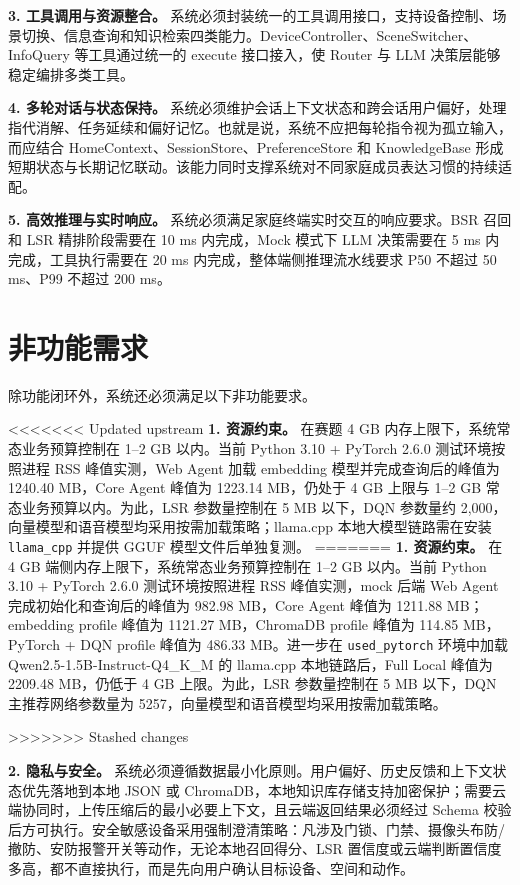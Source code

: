 \documentclass[12pt,a4paper,oneside]{ctexrep}
\begin{document}
\textbf{3. 工具调用与资源整合。} 系统必须封装统一的工具调用接口，支持设备控制、场景切换、信息查询和知识检索四类能力。DeviceController、SceneSwitcher、InfoQuery 等工具通过统一的 execute 接口接入，使 Router 与 LLM 决策层能够稳定编排多类工具。

\textbf{4. 多轮对话与状态保持。} 系统必须维护会话上下文状态和跨会话用户偏好，处理指代消解、任务延续和偏好记忆。也就是说，系统不应把每轮指令视为孤立输入，而应结合 HomeContext、SessionStore、PreferenceStore 和 KnowledgeBase 形成短期状态与长期记忆联动。该能力同时支撑系统对不同家庭成员表达习惯的持续适配。

\textbf{5. 高效推理与实时响应。} 系统必须满足家庭终端实时交互的响应要求。BSR 召回和 LSR 精排阶段需要在 10 ms 内完成，Mock 模式下 LLM 决策需要在 5 ms 内完成，工具执行需要在 20 ms 内完成，整体端侧推理流水线要求 P50 不超过 50 ms、P99 不超过 200 ms。

\section{非功能需求}

除功能闭环外，系统还必须满足以下非功能要求。

<<<<<<< Updated upstream
\textbf{1. 资源约束。} 在赛题 4 GB 内存上限下，系统常态业务预算控制在 1--2 GB 以内。当前 Python 3.10 + PyTorch 2.6.0 测试环境按照进程 RSS 峰值实测，Web Agent 加载 embedding 模型并完成查询后的峰值为 1240.40 MB，Core Agent 峰值为 1223.14 MB，仍处于 4 GB 上限与 1--2 GB 常态业务预算以内。为此，LSR 参数量控制在 5 MB 以下，DQN 参数量约 2,000，向量模型和语音模型均采用按需加载策略；llama.cpp 本地大模型链路需在安装 \texttt{llama\_cpp} 并提供 GGUF 模型文件后单独复测。
=======
\textbf{1. 资源约束。} 在 4 GB 端侧内存上限下，系统常态业务预算控制在 1--2 GB 以内。当前 Python 3.10 + PyTorch 2.6.0 测试环境按照进程 RSS 峰值实测，mock 后端 Web Agent 完成初始化和查询后的峰值为 982.98 MB，Core Agent 峰值为 1211.88 MB；embedding profile 峰值为 1121.27 MB，ChromaDB profile 峰值为 114.85 MB，PyTorch + DQN profile 峰值为 486.33 MB。进一步在 \texttt{used\_pytorch} 环境中加载 Qwen2.5-1.5B-Instruct-Q4\_K\_M 的 llama.cpp 本地链路后，Full Local 峰值为 2209.48 MB，仍低于 4 GB 上限。为此，LSR 参数量控制在 5 MB 以下，DQN 主推荐网络参数量为 5257，向量模型和语音模型均采用按需加载策略。

>>>>>>> Stashed changes

\textbf{2. 隐私与安全。} 系统必须遵循数据最小化原则。用户偏好、历史反馈和上下文状态优先落地到本地 JSON 或 ChromaDB，本地知识库存储支持加密保护；需要云端协同时，上传压缩后的最小必要上下文，且云端返回结果必须经过 Schema 校验后方可执行。安全敏感设备采用强制澄清策略：凡涉及门锁、门禁、摄像头布防/撤防、安防报警开关等动作，无论本地召回得分、LSR 置信度或云端判断置信度多高，都不直接执行，而是先向用户确认目标设备、空间和动作。
\end{document}

